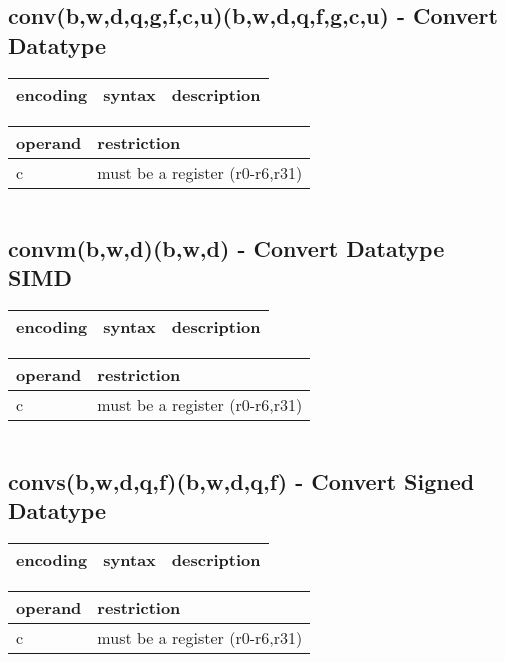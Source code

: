 \documentclass[letterpaper,10pt,openright,twoside,onecolumn]{book}
\begin{document}
\subsection{conv(b,w,d,q,g,f,c,u)(b,w,d,q,f,g,c,u) - Convert Datatype}
  \begin{tabular}{|l|l|l|}
   \hline
    encoding & syntax & description \\
   \hline
   \hline
  \end{tabular}
  \flushleft
  \begin{tabular}{|l|l|}
   \hline
    operand & restriction \\
   \hline
    c & must be a register (r0-r6,r31) \\
   \hline
  \end{tabular}
  \begin{verbatim}
  \end{verbatim}
\newpage\subsection{convm(b,w,d)(b,w,d) - Convert Datatype SIMD}
  \begin{tabular}{|l|l|l|}
   \hline
    encoding & syntax & description \\
   \hline
   \hline
  \end{tabular}
  \flushleft
  \begin{tabular}{|l|l|}
   \hline
    operand & restriction \\
   \hline
    c & must be a register (r0-r6,r31) \\
   \hline
  \end{tabular}
  \begin{verbatim}
  \end{verbatim}
\newpage\subsection{convs(b,w,d,q,f)(b,w,d,q,f) - Convert Signed Datatype}
  \begin{tabular}{|l|l|l|}
   \hline
    encoding & syntax & description \\
   \hline
   \hline
  \end{tabular}
  \flushleft
  \begin{tabular}{|l|l|}
   \hline
    operand & restriction \\
   \hline
    c & must be a register (r0-r6,r31) \\
   \hline
  \end{tabular}
  \begin{verbatim}
  \end{verbatim}
\end{document}
